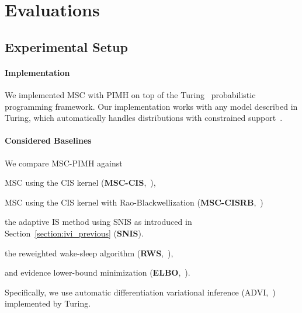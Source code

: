 \section{Evaluations}\label{section:eval}
\subsection{Experimental Setup}
\paragraph{Implementation}
We implemented MSC with PIMH on top of the Turing~\citep{ge2018t} probabilistic programming framework.
Our implementation works with any model described in Turing, which automatically handles distributions with constrained support~\citep{JMLR:v18:16-107}.

\paragraph{Considered Baselines}
We compare MSC-PIMH against
\begin{enumerate*}[label=\textbf{(\roman*)}]
  \item  MSC using the CIS kernel (\textbf{MSC-CIS},~\citealt{NEURIPS2020_b2070693}), 
  \item  MSC using the CIS kernel with Rao-Blackwellization (\textbf{MSC-CISRB},~\citealt{NEURIPS2020_b2070693})
  \item the adaptive IS method using SNIS as introduced in Section~\ref{section:ivi_previous} (\textbf{SNIS}).
  \item the reweighted wake-sleep algorithm (\textbf{RWS},~\citealt{DBLP:journals/corr/BornscheinB14}),  
  \item and evidence lower-bound minimization (\textbf{ELBO},~\citealt{pmlr-v33-ranganath14}).
\end{enumerate*}
Specifically, we use automatic differentiation variational inference (ADVI,~\citealt{JMLR:v18:16-107}) implemented by Turing.

